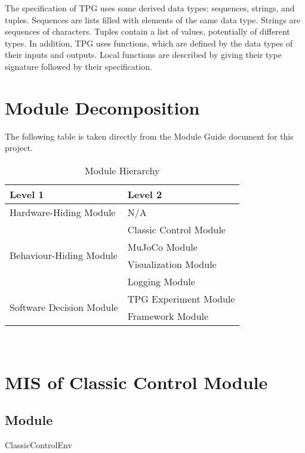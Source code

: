 \documentclass[12pt, titlepage]{article}
\begin{document}
\noindent
The specification of TPG uses some derived data types: sequences, strings, and
tuples. Sequences are lists filled with elements of the same data type. Strings
are sequences of characters. Tuples contain a list of values, potentially of
different types. In addition, TPG uses functions, which
are defined by the data types of their inputs and outputs. Local functions are
described by giving their type signature followed by their specification.

\section{Module Decomposition}

The following table is taken directly from the Module Guide document for this project.

\begin{table}[h!]
  \centering
  \begin{tabular}{p{} p{}}
  \toprule
  \textbf{Level 1} & \textbf{Level 2}\\
  \midrule
  
  {Hardware-Hiding Module} & N/A \\
  \midrule
  
  \multirow{4}{0.3\textwidth}{Behaviour-Hiding Module} & Classic Control Module \\
  & MuJoCo Module\\
  & Visualization Module\\
  & Logging Module\\
  \midrule
  
  \multirow{2}{0.3\textwidth}{Software Decision Module} & {TPG Experiment Module}\\
  & Framework Module\\
  \bottomrule
  
  \end{tabular}
  \caption{Module Hierarchy}
  \label{TblMH}
  \end{table}

\newpage
~\newpage
\section{MIS of Classic Control Module} \label{ClassicControl Module}

\subsection{Module}
ClassicControlEnv
\end{document}
